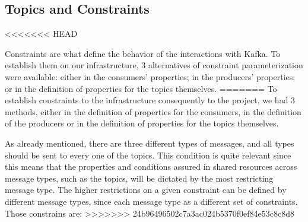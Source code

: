 \documentclass[12pt]{article}
\begin{document}
\subsection{Topics and Constraints} \label{topics} %
<<<<<<< HEAD

Constraints are what define the behavior of the interactions with Kafka.
To establish them on our infrastructure, 3 alternatives of constraint parameterization were available: 
either in the consumers' properties; in the producers' properties; or in the definition of properties for the topics themselves.
=======
To establish constraints to the infrastructure consequently to the project, we had 3 methods, either in the definition of properties for the consumers, in the definition of the producers or in the definition of properties for the topics themselves.

As already mentioned, there are three different types of messages, and all types should be sent to every one of the topics. This condition is quite relevant since this means that the properties and conditions assured in shared resources across message types, such as the topics, will be dictated by the most restricting message type. The higher restrictions on a given constraint can be defined by different message types, since each message type as a different set of constraints. Those constrains are:
>>>>>>> 24b96496502c7a3ac024b5370f0ef84e53c8c8d8
\end{document}
